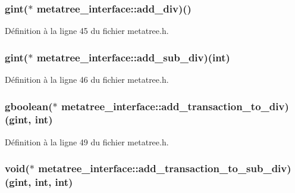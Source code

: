 \subsubsection[{add\_\-div}]{\setlength{\rightskip}{0pt plus 5cm}gint($\ast$  {\bf metatree\_\-interface::add\_\-div})()}\label{structmetatree__interface_a646b1dc505a16f0fca45a49171890c56}


Définition à la ligne 45 du fichier metatree.h.

\subsubsection[{add\_\-sub\_\-div}]{\setlength{\rightskip}{0pt plus 5cm}gint($\ast$  {\bf metatree\_\-interface::add\_\-sub\_\-div})(int)}\label{structmetatree__interface_a61b8cb425a554296258fc34eed00abb0}


Définition à la ligne 46 du fichier metatree.h.

\subsubsection[{add\_\-transaction\_\-to\_\-div}]{\setlength{\rightskip}{0pt plus 5cm}gboolean($\ast$  {\bf metatree\_\-interface::add\_\-transaction\_\-to\_\-div})(gint, int)}\label{structmetatree__interface_a2be0eb2049ea2110b10501c5e27cf6e3}


Définition à la ligne 49 du fichier metatree.h.

\subsubsection[{add\_\-transaction\_\-to\_\-sub\_\-div}]{\setlength{\rightskip}{0pt plus 5cm}void($\ast$  {\bf metatree\_\-interface::add\_\-transaction\_\-to\_\-sub\_\-div})(gint, int, int)}\label{structmetatree__interface_aa43e3294c308800aa226dee40f048a5b}


